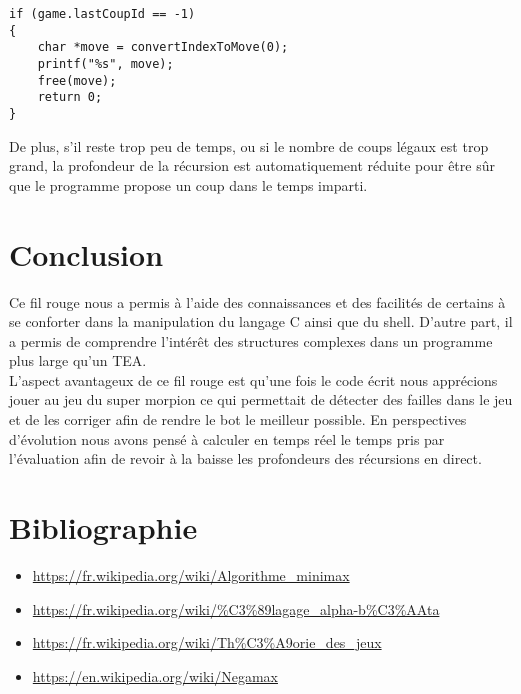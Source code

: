 \documentclass[14pt,a4paper]{article}
\begin{document}
\begin{lstlisting}
if (game.lastCoupId == -1)
{
    char *move = convertIndexToMove(0);
    printf("%s", move);
    free(move);
    return 0;
}
\end{lstlisting}

De plus, s'il reste trop peu de temps, ou si le nombre de coups légaux est trop grand, la profondeur de la récursion est automatiquement réduite pour être sûr que le programme propose un coup dans le temps imparti.

\section*{Conclusion}
Ce fil rouge nous a permis à l'aide des connaissances et des facilités de certains à se conforter dans la manipulation du langage C ainsi que du shell. D'autre part, il a permis de comprendre l'intérêt des structures complexes dans un programme plus large qu'un TEA.\\
L'aspect avantageux de ce fil rouge est qu'une fois le code écrit nous apprécions jouer au jeu du super morpion ce qui permettait de détecter des failles dans le jeu et de les corriger afin de rendre le bot le meilleur possible. En perspectives d'évolution nous avons pensé à calculer en temps réel le temps pris par l'évaluation afin de revoir à la baisse les profondeurs des récursions en direct.

\newpage
\section*{Bibliographie}
\begin{itemize}
    \item \url{https://fr.wikipedia.org/wiki/Algorithme_minimax}
    \item \url{https://fr.wikipedia.org/wiki/\%C3\%89lagage_alpha-b\%C3\%AAta}
    \item \url{https://fr.wikipedia.org/wiki/Th\%C3\%A9orie_des_jeux}
    \item \url{https://en.wikipedia.org/wiki/Negamax}
\end{itemize}
\end{document}
